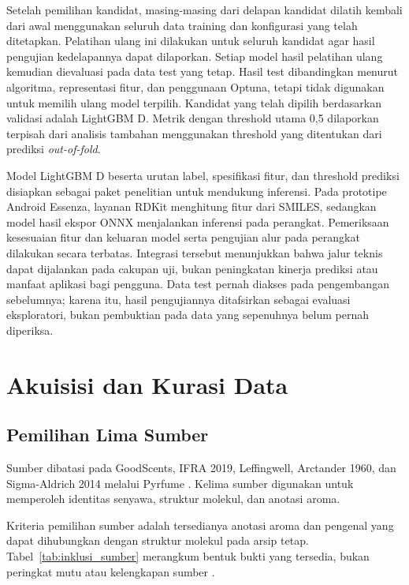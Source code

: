 Setelah pemilihan kandidat, masing-masing dari delapan kandidat dilatih kembali dari awal menggunakan seluruh data training dan konfigurasi yang telah ditetapkan. Pelatihan ulang ini dilakukan untuk seluruh kandidat agar hasil pengujian kedelapannya dapat dilaporkan. Setiap model hasil pelatihan ulang kemudian dievaluasi pada data test yang tetap. Hasil test dibandingkan menurut algoritma, representasi fitur, dan penggunaan Optuna, tetapi tidak digunakan untuk memilih ulang model terpilih. Kandidat yang telah dipilih berdasarkan validasi adalah LightGBM D. Metrik dengan threshold utama 0,5 dilaporkan terpisah dari analisis tambahan menggunakan threshold yang ditentukan dari prediksi \textit{out-of-fold}.

Model LightGBM D beserta urutan label, spesifikasi fitur, dan threshold prediksi disiapkan sebagai paket penelitian untuk mendukung inferensi. Pada prototipe Android Essenza, layanan RDKit menghitung fitur dari SMILES, sedangkan model hasil ekspor ONNX menjalankan inferensi pada perangkat. Pemeriksaan kesesuaian fitur dan keluaran model serta pengujian alur pada perangkat dilakukan secara terbatas. Integrasi tersebut menunjukkan bahwa jalur teknis dapat dijalankan pada cakupan uji, bukan peningkatan kinerja prediksi atau manfaat aplikasi bagi pengguna. Data test pernah diakses pada pengembangan sebelumnya; karena itu, hasil pengujiannya ditafsirkan sebagai evaluasi eksploratori, bukan pembuktian pada data yang sepenuhnya belum pernah diperiksa.

\section{Akuisisi dan Kurasi Data}
\subsection{Pemilihan Lima Sumber}
Sumber dibatasi pada GoodScents, IFRA 2019, Leffingwell, Arctander 1960, dan Sigma-Aldrich 2014 melalui Pyrfume \cite{hamel2024,pyrfumeFive2026}. Kelima sumber digunakan untuk memperoleh identitas senyawa, struktur molekul, dan anotasi aroma.

Kriteria pemilihan sumber adalah tersedianya anotasi aroma dan pengenal yang dapat dihubungkan dengan struktur molekul pada arsip tetap. Tabel~\ref{tab:inklusi_sumber} merangkum bentuk bukti yang tersedia, bukan peringkat mutu atau kelengkapan sumber \cite{pyrfumeFive2026}.

